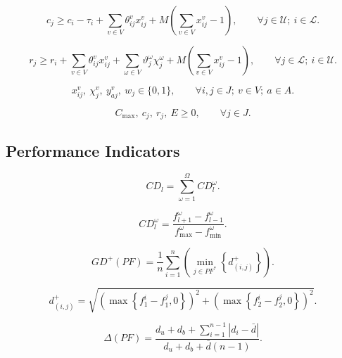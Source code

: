 \documentclass[11pt]{article}
\begin{document}
\begin{equation}
c_j
\ge
c_i - \tau_i
+
\sum_{v\in V}\theta_{ij}^{v}x_{ij}^{v}
+
M\left(\sum_{v\in V}x_{ij}^{v}-1\right),
\qquad \forall j \in \mathcal{U};\ i \in \mathcal{L}.
\tag{17}
\end{equation}

\begin{equation}
r_j
\ge
r_i
+
\sum_{v\in V}\theta_{ij}^{v}x_{ij}^{v}
+
\sum_{\omega\in V}\vartheta_j^{\omega}\chi_j^{\omega}
+
M\left(\sum_{v\in V}x_{ij}^{v}-1\right),
\qquad \forall j \in \mathcal{L};\ i \in \mathcal{U}.
\tag{18}
\end{equation}

\begin{equation}
x_{ij}^{v},\ \chi_j^{v},\ y_{aj}^{v},\ w_j \in \{0,1\},
\qquad \forall i,j \in J;\ v \in V;\ a \in A.
\tag{19}
\end{equation}

\begin{equation}
C_{\max},\ c_j,\ r_j,\ E \ge 0,
\qquad \forall j \in J.
\tag{20}
\end{equation}

\subsection{Performance Indicators}

\[
CD_l = \sum_{\omega=1}^{\Omega} CD_l^{\omega}.
\]

\begin{equation}
CD_l^{\omega}
=
\frac{f_{l+1}^{\omega}-f_{l-1}^{\omega}}
     {f_{\max}^{\omega}-f_{\min}^{\omega}}.
\tag{21}
\end{equation}

\begin{equation}
GD^{+}(PF)
=
\frac{1}{n}
\sum_{i=1}^{n}
\left(
    \min_{j\in PF^{*}}\left\{d_{(i,j)}^{+}\right\}
\right).
\tag{22a}
\end{equation}

\begin{equation}
d_{(i,j)}^{+}
=
\sqrt{
    \left(\max\left\{f_1^{i}-f_1^{j},0\right\}\right)^2
    +
    \left(\max\left\{f_2^{i}-f_2^{j},0\right\}\right)^2
}.
\tag{22b}
\end{equation}

\begin{equation}
\Delta(PF)
=
\frac{
    d_u+d_b+\sum_{i=1}^{n-1}\left|d_i-\bar{d}\right|
}{
    d_u+d_b+\bar{d}(n-1)
}.
\tag{23}
\end{equation}
\end{document}
